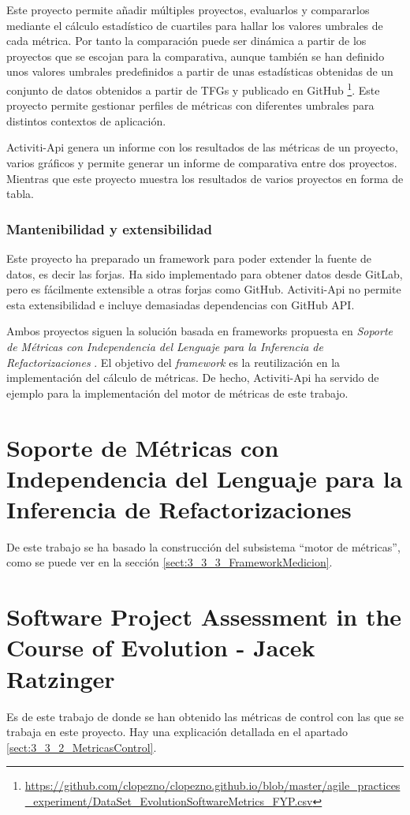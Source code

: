 Este proyecto permite añadir múltiples proyectos, evaluarlos y compararlos mediante el cálculo estadístico de cuartiles para hallar los valores umbrales de cada métrica. Por tanto la comparación puede ser dinámica a partir de los proyectos que se escojan para la comparativa, aunque también se han definido unos valores umbrales predefinidos a partir de unas estadísticas obtenidas de un conjunto de datos obtenidos a partir de TFGs y publicado en GitHub \footnote{\url{https://github.com/clopezno/clopezno.github.io/blob/master/agile_practices_experiment/DataSet_EvolutionSoftwareMetrics_FYP.csv}}. Este proyecto permite gestionar perfiles de métricas con diferentes umbrales para distintos contextos de aplicación.

Activiti-Api genera un informe con los resultados de las métricas de un proyecto, varios gráficos y permite generar un informe de comparativa entre dos proyectos. Mientras que este proyecto muestra los resultados de varios proyectos en forma de tabla.

\subsubsection{Mantenibilidad y extensibilidad}

Este proyecto ha preparado un  framework para poder extender la fuente de datos, es decir las forjas. Ha sido implementado para obtener datos desde GitLab, pero es fácilmente extensible a otras forjas como GitHub. Activiti-Api no permite esta extensibilidad e incluye demasiadas dependencias con GitHub API.

Ambos proyectos siguen la solución basada en frameworks propuesta en \textit{Soporte de Métricas con Independencia del Lenguaje para la Inferencia de Refactorizaciones} \cite{marticorena_soporte_2005}. El objetivo del \textit{framework} es la reutilización en la implementación del cálculo de métricas. De hecho, Activiti-Api ha servido de ejemplo para la implementación del motor de métricas de este trabajo.

\section{Soporte de Métricas con Independencia del Lenguaje para la Inferencia de Refactorizaciones}

De este trabajo se ha basado la construcción del subsistema ``motor de métricas'', como se puede ver en la sección \ref{sect:3_3_3_FrameworkMedicion}.

\section{Software Project Assessment in the Course of Evolution -  Jacek Ratzinger}

Es de este trabajo de donde se han obtenido las métricas de control con las que se trabaja en este proyecto. Hay una explicación detallada en el apartado \ref{sect:3_3_2_MetricasControl}.